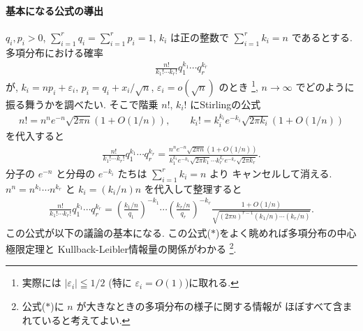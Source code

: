 \documentclass[12pt,twoside]{jarticle}
\newcommand\eps{\varepsilon}
\theoremstyle{jplain}
\theoremstyle{jplain}
\theoremstyle{jplain}
\numberwithin{theorem}{section}
\numberwithin{equation}{section}
\numberwithin{figure}{section}
\numberwithin{table}{section}
\begin{document}
\paragraph{基本になる公式の導出}
$q_i,p_i>0$, $\sum_{i=1}^r q_i=\sum_{i=1}^r p_i=1$,
$k_i$ は正の整数で $\sum_{i=1}^r k_i=n$ であるとする.
多項分布における確率
\begin{align*}
\frac{n!}{k_1!\cdots k_r!}q_1^{k_1}\cdots q_r^{k_r}
\end{align*}
が, $k_i=np_i+\eps_i$, $p_i=q_i+x_i/\sqrt{n}$, $\eps_i=o(\sqrt{n})$ のとき%
\footnote{実際には $|\eps_i|\leqq 1/2$ (特に $\eps_i=O(1)$)に取れる.},
$n\to\infty$ でどのように振る舞うかを調べたい.
そこで階乗 $n!$, $k_i!$ にStirlingの公式
\begin{align*}
n! = n^n e^{-n}\sqrt{2\pi n}(1+O(1/n)), \qquad
k_i! = k_i^{k_i} e^{-k_i}\sqrt{2\pi k_i}(1+O(1/n))
\end{align*}
を代入すると
\begin{align*}
\frac{n!}{k_1!\cdots k_r!}q_1^{k_1}\cdots q_r^{k_r}
=
\frac
{n^n e^{-n}\sqrt{2\pi n}(1+O(1/n))}
{k_1^{k_1} e^{-k_1}\sqrt{2\pi k_1}\cdots k_r^{k_r} e^{-k_r}\sqrt{2\pi k_r}}.
\end{align*}
分子の $e^{-n}$ と分母の $e^{-k_i}$ たちは $\sum_{i=1}^r k_i=n$ より
キャンセルして消える.
$n^n=n^{k_1}\cdots n^{k_r}$ と $k_i=(k_i/n)n$ を代入して整理すると
\begin{align*}
\frac{n!}{k_1!\cdots k_r!}q_1^{k_1}\cdots q_r^{k_r}
=
\left(\frac{k_1/n}{q_1}\right)^{-k_1}\cdots\left(\frac{k_r/n}{q_r}\right)^{-k_r}
\frac{1+O(1/n)}{\sqrt{(2\pi n)^{r-1}(k_1/n)\cdots(k_r/n)}}.
\tag{$*$}
\end{align*}
この公式が以下の議論の基本になる.
この公式($*$)をよく眺めれば多項分布の中心極限定理と
Kullback-Leibler情報量の関係がわかる%
\footnote{公式($*$)に $n$ が大きなときの多項分布の様子に関する情報が
ほぼすべて含まれていると考えてよい.}.
\end{document}
